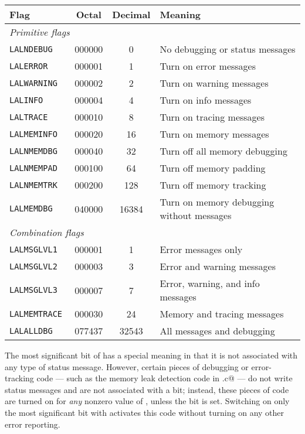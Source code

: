 \documentclass[10pt]{ligodcc}
\begin{document}
\begin{center}
\begin{tabular}{|lccl|}
\hline
Flag & Octal & Decimal & Meaning \\
\hline
\multicolumn{4}{|l|}{\it Primitive flags} \\
\tt LALNDEBUG   & 000000 &     0 & No debugging or status messages \\
\tt LALERROR    & 000001 &     1 & Turn on error messages \\
\tt LALWARNING  & 000002 &     2 & Turn on warning messages \\
\tt LALINFO     & 000004 &     4 & Turn on info messages \\
\tt LALTRACE    & 000010 &     8 & Turn on tracing messages \\
\tt LALMEMINFO  & 000020 &    16 & Turn on memory messages \\
\tt LALNMEMDBG  & 000040 &    32 & Turn off all memory debugging \\
\tt LALNMEMPAD  & 000100 &    64 & Turn off memory padding \\
\tt LALNMEMTRK  & 000200 &   128 & Turn off memory tracking \\
\tt LALMEMDBG   & 040000 & 16384 & Turn on memory debugging without messages \\
\multicolumn{4}{|l|}{\it Combination flags} \\
\tt LALMSGLVL1  & 000001 &     1 & Error messages only \\
\tt LALMSGLVL2  & 000003 &     3 & Error and warning messages \\
\tt LALMSGLVL3  & 000007 &     7 & Error, warning, and info messages \\
\tt LALMEMTRACE & 000030 &    24 & Memory and tracing messages \\
\tt LALALLDBG   & 077437 & 32543 & All messages and debugging \\
\hline
\end{tabular}
\end{center}

The most significant bit
of \verb@lalDebugLevel@ has a special meaning in that it is not
associated with any type of status message.  However, certain pieces
of debugging or error-tracking code --- such as the memory leak
detection code in \verb@LALMalloc.c@ --- do not write status messages
and are not associated with a \verb@lalDebugLevel@ bit; instead, these
pieces of code are turned on for \emph{any} nonzero value of
\verb@lalDebugLevel@, unless the \verb@LALNMEMDBG@ bit is set.
Switching on only the most significant bit with
\verb@LALMEMDBG@ activates this code without turning on any other
error reporting.
\end{document}
